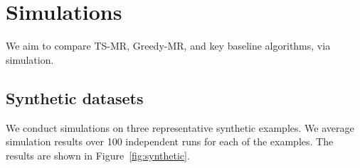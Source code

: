 \section{Simulations}
\label{sec:simulation}


We aim to compare TS-MR, Greedy-MR, and key baseline algorithms, via simulation.



\subsection{Synthetic datasets}
\label{sec:simulation_synthetic}



We conduct simulations on three representative synthetic examples.  We average simulation results over 100 independent runs for each of the examples. The results are shown in Figure~\ref{fig:synthetic}.













